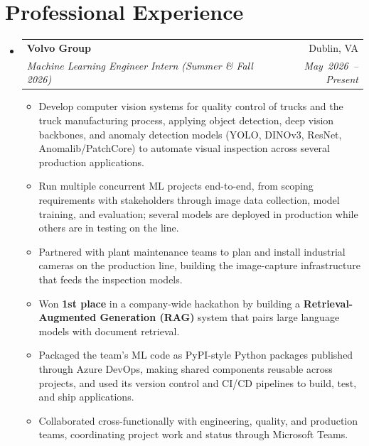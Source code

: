 \documentclass[letterpaper,10pt]{article}
\makeatletter
\newcommand{\resumeItem}[1]{\item\small{#1}}
\newcommand{\resumeSubheading}[4]{
  \vspace{1pt}\item
    \begin{tabular*}{\textwidth}[t]{@{}l@{\extracolsep{\fill}}r@{}}
      \textbf{#1} & #2 \\
      \textit{\small #3} & \textit{\small\mbox{#4}} \\
    \end{tabular*}\vspace{-2pt}
}
\newcommand{\resumeSubHeadingListStart}{\begin{itemize}[leftmargin=0pt, label={}, itemsep=0pt, parsep=0pt]}
\newcommand{\resumeSubHeadingListEnd}{\end{itemize}}
\newcommand{\resumeItemListStart}{\begin{itemize}[leftmargin=0.18in, itemsep=0pt, parsep=0pt, topsep=4pt]}
\newcommand{\resumeItemListEnd}{\end{itemize}\vspace{-4pt}}
\makeatother
\begin{document}
\section{Professional Experience}
\resumeSubHeadingListStart
    \resumeSubheading
      {Volvo Group}{Dublin, VA}
      {Machine Learning Engineer Intern (Summer \& Fall 2026)}{May 2026 -- Present}
      \resumeItemListStart
        \resumeItem{Develop computer vision systems for quality control of trucks and the truck manufacturing process, applying object detection, deep vision backbones, and anomaly detection models (YOLO, DINOv3, ResNet, Anomalib/PatchCore) to automate visual inspection across several production applications.}
        \resumeItem{Run multiple concurrent ML projects end-to-end, from scoping requirements with stakeholders through image data collection, model training, and evaluation; several models are deployed in production while others are in testing on the line.}
        \resumeItem{Partnered with plant maintenance teams to plan and install industrial cameras on the production line, building the image-capture infrastructure that feeds the inspection models.}
        \resumeItem{Won \textbf{1st place} in a company-wide hackathon by building a \textbf{Retrieval-Augmented Generation (RAG)} system that pairs large language models with document retrieval.}
        \resumeItem{Packaged the team's ML code as PyPI-style Python packages published through Azure DevOps, making shared components reusable across projects, and used its version control and CI/CD pipelines to build, test, and ship applications.}
        \resumeItem{Collaborated cross-functionally with engineering, quality, and production teams, coordinating project work and status through Microsoft Teams.}
      \resumeItemListEnd
\resumeSubHeadingListEnd

\end{document}
